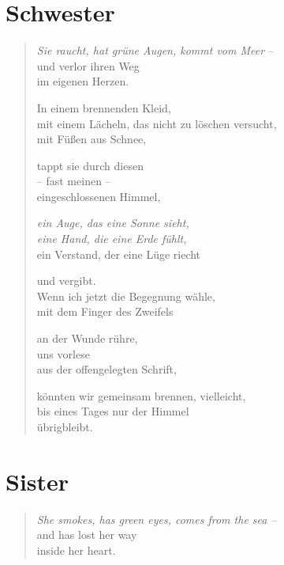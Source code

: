 
{\setlength{\stanzaskip}{0.6em}

\cleartoverso

\section{Schwester}

\begin{verse}

\emph{Sie raucht, hat grüne Augen, kommt vom Meer} --\\
und verlor ihren Weg\\
im eigenen Herzen.

In einem brennenden Kleid,\\
mit einem Lächeln, das nicht zu löschen versucht,\\
mit Füßen aus Schnee,

tappt sie durch diesen\\
-- fast meinen --\\
eingeschlossenen Himmel,

\emph{ein Auge, das eine Sonne sieht,\\
eine Hand, die eine Erde fühlt,}\\
ein Verstand, der eine Lüge riecht

und vergibt.\\
Wenn ich jetzt die Begegnung wähle,\\
mit dem Finger des Zweifels

an der Wunde rühre,\\
uns vorlese\\
aus der offengelegten Schrift,

könnten wir gemeinsam brennen, vielleicht,\\
bis eines Tages nur der Himmel\\
übrigbleibt.

\end{verse}

\clearpage

\section{Sister}

\begin{verse}

\emph{She smokes, has green eyes, comes from the sea --}\label{marina-autobio}\\
and has lost her way\\
inside her heart.


\end{verse}}
